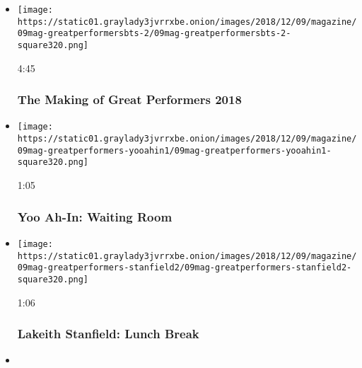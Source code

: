 \begin{itemize}
\item
  \href{https://www.nytimes3xbfgragh.onion/video/magazine/100000006247450/the-making-of-great-performers-2018.html?action=click\&module=video-series-bar\&region=header\&pgtype=Article\&playlistId=video/great-performers}{}

  \texttt{[image: https://static01.graylady3jvrrxbe.onion/images/2018/12/09/magazine/09mag-greatperformersbts-2/09mag-greatperformersbts-2-square320.png]}

  4:45

  \hypertarget{the-making-of-great-performers-2018}{%
  \subsubsection{The Making of Great Performers
  2018}\label{the-making-of-great-performers-2018}}
\item
  \href{https://www.nytimes3xbfgragh.onion/video/magazine/100000006246888/yoo-ah-in-waiting-room.html?action=click\&module=video-series-bar\&region=header\&pgtype=Article\&playlistId=video/great-performers}{}

  \texttt{[image: https://static01.graylady3jvrrxbe.onion/images/2018/12/09/magazine/09mag-greatperformers-yooahin1/09mag-greatperformers-yooahin1-square320.png]}

  1:05

  \hypertarget{yoo-ah-in-waiting-room}{%
  \subsubsection{Yoo Ah-In: Waiting Room}\label{yoo-ah-in-waiting-room}}
\item
  \href{https://www.nytimes3xbfgragh.onion/video/magazine/100000006246869/lakeith-stanfield-lunch-break.html?action=click\&module=video-series-bar\&region=header\&pgtype=Article\&playlistId=video/great-performers}{}

  \texttt{[image: https://static01.graylady3jvrrxbe.onion/images/2018/12/09/magazine/09mag-greatperformers-stanfield2/09mag-greatperformers-stanfield2-square320.png]}

  1:06

  \hypertarget{lakeith-stanfield-lunch-break}{%
  \subsubsection{Lakeith Stanfield: Lunch
  Break}\label{lakeith-stanfield-lunch-break}}
\item
  \href{https://www.nytimes3xbfgragh.onion/video/magazine/100000006246850/julia-roberts-the-commuter.html?action=click\&module=video-series-bar\&region=header\&pgtype=Article\&playlistId=video/great-performers}{}


\end{itemize}
